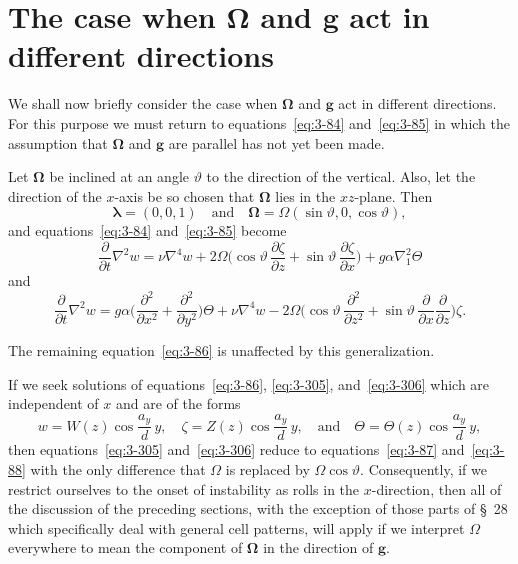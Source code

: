 \section{The case when $\boldsymbol{\Omega}$ and $\mathbf{g}$ act in different directions}\label{sec:3-34}

We shall now briefly consider the case when $\boldsymbol{\Omega}$ and $\mathbf{g}$ act in different directions. For this purpose we must return to equations~\eqref{eq:3-84} and~\eqref{eq:3-85} in which the assumption that $\boldsymbol{\Omega}$ and $\mathbf{g}$ are parallel has not yet been made.

Let $\boldsymbol{\Omega}$ be inclined at an angle $\vartheta$ to the direction of the vertical. Also, let the direction of the $x$-axis be so chosen that $\boldsymbol{\Omega}$ lies in the $xz$-plane. Then
\begin{equation}\label{eq:3-304}
\boldsymbol{\lambda} = (0, 0, 1) \quad \text{and} \quad \boldsymbol{\Omega} = \Omega(\sin\vartheta, 0, \cos\vartheta),
\end{equation}
and equations~\eqref{eq:3-84} and~\eqref{eq:3-85} become
\begin{equation}\label{eq:3-305}
\frac{\partial}{\partial t}\nabla^2 w = \nu\nabla^4 w + 2\Omega\bigg(\cos\vartheta\,\frac{\partial \zeta}{\partial z} + \sin\vartheta\,\frac{\partial \zeta}{\partial x}\bigg) + g\alpha\nabla_1^2\Theta
\end{equation}
and
\begin{equation}\label{eq:3-306}
\frac{\partial}{\partial t}\nabla^2 w = g\alpha\bigg(\frac{\partial^2}{\partial x^2} + \frac{\partial^2}{\partial y^2}\bigg)\Theta + \nu\nabla^4 w - 2\Omega\bigg(\cos\vartheta\,\frac{\partial^2}{\partial z^2} + \sin\vartheta\,\frac{\partial}{\partial x}\frac{\partial}{\partial z}\bigg)\zeta.
\end{equation}

The remaining equation~\eqref{eq:3-86} is unaffected by this generalization.

If we seek solutions of equations~\eqref{eq:3-86}, \eqref{eq:3-305}, and~\eqref{eq:3-306} which are independent of $x$ and are of the forms
\begin{equation}\label{eq:3-307}
w = W(z)\cos\frac{a_y}{d}\,y, \quad \zeta = Z(z)\cos\frac{a_y}{d}\,y, \quad \text{and} \quad \Theta = \Theta(z)\cos\frac{a_y}{d}\,y,
\end{equation}
then equations~\eqref{eq:3-305} and~\eqref{eq:3-306} reduce to equations~\eqref{eq:3-87} and~\eqref{eq:3-88} with the only difference that $\Omega$ is replaced by $\Omega\cos\vartheta$. Consequently, if we restrict ourselves to the onset of instability as rolls in the $x$-direction, then all of the discussion of the preceding sections, with the exception of those parts of \S~28 which specifically deal with general cell patterns, will apply if we interpret $\Omega$ everywhere to mean the component of $\boldsymbol{\Omega}$ in the direction of $\mathbf{g}$.


